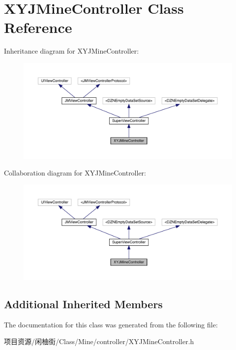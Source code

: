 \hypertarget{interface_x_y_j_mine_controller}{}\section{X\+Y\+J\+Mine\+Controller Class Reference}
\label{interface_x_y_j_mine_controller}


Inheritance diagram for X\+Y\+J\+Mine\+Controller\+:\nopagebreak
\begin{figure}[H]
\begin{center}
\leavevmode
\includegraphics[width=350pt]{interface_x_y_j_mine_controller__inherit__graph}
\end{center}
\end{figure}


Collaboration diagram for X\+Y\+J\+Mine\+Controller\+:\nopagebreak
\begin{figure}[H]
\begin{center}
\leavevmode
\includegraphics[width=350pt]{interface_x_y_j_mine_controller__coll__graph}
\end{center}
\end{figure}
\subsection*{Additional Inherited Members}


The documentation for this class was generated from the following file\+:\begin{DoxyCompactItemize}
\item 
项目资源/闲柚街/\+Class/\+Mine/controller/X\+Y\+J\+Mine\+Controller.\+h\end{DoxyCompactItemize}
